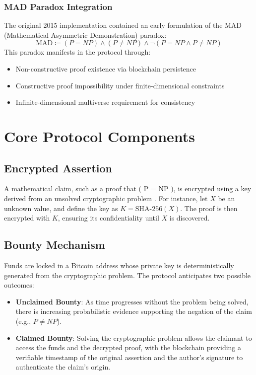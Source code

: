 \documentclass[12pt]{report}
\begin{document}
\subsubsection{MAD Paradox Integration}
The original 2015 implementation contained an early formulation of the MAD (Mathematical Asymmetric Demonstration) paradox:
\begin{equation*}
\text{MAD} \coloneqq (P=NP) \land (P\neq NP) \land \neg(P=NP \land P\neq NP)
\end{equation*}
This paradox manifests in the protocol through:
\begin{itemize}
    \item Non-constructive proof existence via blockchain persistence
    \item Constructive proof impossibility under finite-dimensional constraints
    \item Infinite-dimensional multiverse requirement for consistency
\end{itemize}

\section{Core Protocol Components}
\subsection{Encrypted Assertion}

A mathematical claim, such as a proof that ( P = NP ), is encrypted using a key derived from an unsolved cryptographic problem \cite{DiffieHellman1976}. For instance, let \( X \) be an unknown value, and define the key as \( K = \text{SHA-256}(X) \). The proof is then encrypted with \( K \), ensuring its confidentiality until \( X \) is discovered.

\subsection{Bounty Mechanism}

Funds are locked in a Bitcoin address whose private key is deterministically generated from the cryptographic problem. The protocol anticipates two possible outcomes:

\begin{itemize}
    \item \textbf{Unclaimed Bounty}: As time progresses without the problem being solved, there is increasing probabilistic evidence supporting the negation of the claim (e.g., \( P \neq NP \)).
    \item \textbf{Claimed Bounty}: Solving the cryptographic problem allows the claimant to access the funds and the decrypted proof, with the blockchain providing a verifiable timestamp of the original assertion and the author's signature to authenticate the claim's origin.
\end{itemize}
\end{document}
